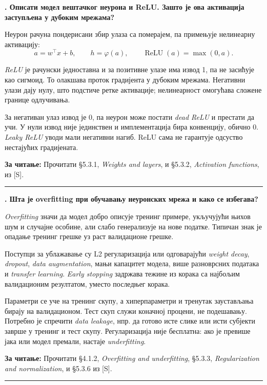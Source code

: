 \documentclass[10pt,a4paper]{article}
\newcommand{\en}[1]{\textit{#1}}
\newcounter{pitanje}
\newenvironment{odgovor}[1]{\stepcounter{pitanje}\begin{minipage}[t][0.455\textheight][t]{\textwidth}\vspace{0pt}\textbf{\thepitanje. #1}\par\smallskip}{\end{minipage}\par\ifodd\value{pitanje}\vspace{0.025\textheight}\hrule\vspace{0.015\textheight}\else\newpage\fi}
\newcommand{\izvor}[1]{\par\vfill{\footnotesize\textbf{За читање:} #1}\par}
\begin{document}
\begin{odgovor}{Описати модел вештачког неурона и ReLU. Зашто је ова активација заступљена у дубоким мрежама?}
Неурон рачуна пондерисани збир улаза са померајем, па примењује нелинеарну активацију:
\[
a=w^\top x+b,\qquad h=\varphi(a),\qquad \operatorname{ReLU}(a)=\max(0,a).
\]
\begin{center}\end{center}
\en{ReLU} је рачунски једноставна и за позитивне улазе има извод 1, па не засићује као сигмоид. То олакшава проток градијента у дубоким мрежама. Негативни улази дају нулу, што подстиче ретке активације; нелинеарност омогућава сложене границе одлучивања.

За негативан улаз извод је 0, па неурон може постати \en{dead ReLU} и престати да учи. У нули извод није јединствен и имплементација бира конвенцију, обично 0. \en{Leaky ReLU} уводи мали негативни нагиб. ReLU сама не гарантује одсуство нестајућих градијената.
\izvor{Прочитати §5.3.1, \en{Weights and layers}, и §5.3.2, \en{Activation functions}, из [S].}
\end{odgovor}

\begin{odgovor}{Шта је overfitting при обучавању неуронских мрежа и како се избегава?}
\en{Overfitting} значи да модел добро описује тренинг примере, укључујући њихов шум и случајне особине, али слабо генерализује на нове податке. Типичан знак је опадање тренинг грешке уз раст валидационе грешке.

Поступци за ублажавање су L2 регуларизација или одговарајући \en{weight decay}, \en{dropout}, \en{data augmentation}, мањи капацитет модела, више разноврсних података и \en{transfer learning}. \en{Early stopping} задржава тежине из корака са најбољим валидационим резултатом, уместо последњег корака.

Параметри се уче на тренинг скупу, а хиперпараметри и тренутак заустављања бирају на валидационом. Тест скуп служи коначној процени, не подешавању. Потребно је спречити \en{data leakage}, нпр. да готово исте слике или исти субјекти заврше у тренинг и тест скупу. Регуларизација није бесплатна: ако је превише јака или модел премали, настаје \en{underfitting}.
\izvor{Прочитати §4.1.2, \en{Overfitting and underfitting}, §5.3.3, \en{Regularization and normalization}, и §5.3.6 из [S].}
\end{odgovor}
\end{document}
